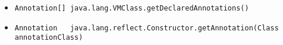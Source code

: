 \documentclass[a4paper, 10pt, titlepage]{scrartcl} %
\begin{document}
\begin{itemize}
 \item \begin{scriptsize}\verb|Annotation|\hspace{0.0pt}\verb|[|\hspace{0.0pt}\verb||\hspace{0.0pt}\verb|]|\hspace{0.0pt}\verb||\hspace{0.0pt}\verb| |\hspace{0.0pt}\verb|java|\hspace{0.0pt}\verb|.|\hspace{0.0pt}\verb|lang|\hspace{0.0pt}\verb|.|\hspace{0.0pt}\verb|VMClass|\hspace{0.0pt}\verb|.|\hspace{0.0pt}\verb|getDeclaredAnnotations|\hspace{0.0pt}\verb|(|\hspace{0.0pt}\verb||\hspace{0.0pt}\verb|)|\hspace{0.0pt}\verb||\end{scriptsize}
 \item \begin{scriptsize}\verb|Annotation|\hspace{0.0pt}\verb| |\hspace{0.0pt}\verb||\hspace{0.0pt}\verb| |\hspace{0.0pt}\verb||\hspace{0.0pt}\verb| |\hspace{0.0pt}\verb|java|\hspace{0.0pt}\verb|.|\hspace{0.0pt}\verb|lang|\hspace{0.0pt}\verb|.|\hspace{0.0pt}\verb|reflect|\hspace{0.0pt}\verb|.|\hspace{0.0pt}\verb|Constructor|\hspace{0.0pt}\verb|.|\hspace{0.0pt}\verb|getAnnotation|\hspace{0.0pt}\verb|(|\hspace{0.0pt}\verb|Class|\hspace{0.0pt}\verb| |\hspace{0.0pt}\verb|annotationClass|\hspace{0.0pt}\verb|)|\hspace{0.0pt}\verb||\end{scriptsize}

\end{itemize}
\end{document}
